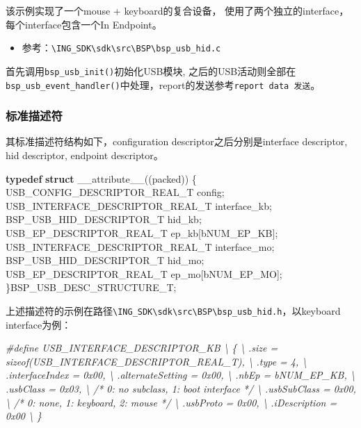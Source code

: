 \documentclass[
  12pt,
]{book}
\newenvironment{Shaded}{\begin{snugshade}}{\end{snugshade}}
\newcommand{\KeywordTok}[1]{\textcolor[rgb]{0.13,0.29,0.53}{\textbf{#1}}}
\newcommand{\NormalTok}[1]{#1}
\newcommand{\PreprocessorTok}[1]{\textcolor[rgb]{0.56,0.35,0.01}{\textit{#1}}}
\providecommand{\tightlist}{%
  \setlength{\itemsep}{0pt}\setlength{\parskip}{0pt}}
\begin{document}
该示例实现了一个mouse + keyboard的复合设备， 使用了两个独立的interface，每个interface包含一个In Endpoint。

\begin{itemize}
\tightlist
\item
  参考：\texttt{\textbackslash{}ING\_SDK\textbackslash{}sdk\textbackslash{}src\textbackslash{}BSP\textbackslash{}bsp\_usb\_hid.c}
\end{itemize}

首先调用\texttt{bsp\_usb\_init()}初始化USB模块, 之后的USB活动则全部在\texttt{bsp\_usb\_event\_handler()}中处理，report的发送参考\texttt{report\ data\ 发送}。

\hypertarget{ux6807ux51c6ux63cfux8ff0ux7b26}{%
\subsubsection{标准描述符}\label{ux6807ux51c6ux63cfux8ff0ux7b26}}

其标准描述符结构如下，configuration descriptor之后分别是interface descriptor, hid descriptor, endpoint descriptor。

\begin{Shaded}
\begin{Highlighting}[]
\KeywordTok{typedef} \KeywordTok{struct}\NormalTok{ __attribute__((packed))}
\NormalTok{\{}
\NormalTok{  USB_CONFIG_DESCRIPTOR_REAL_T config;}
\NormalTok{  USB_INTERFACE_DESCRIPTOR_REAL_T interface_kb;}
\NormalTok{  BSP_USB_HID_DESCRIPTOR_T hid_kb;}
\NormalTok{  USB_EP_DESCRIPTOR_REAL_T ep_kb[bNUM_EP_KB];}
\NormalTok{  USB_INTERFACE_DESCRIPTOR_REAL_T interface_mo;}
\NormalTok{  BSP_USB_HID_DESCRIPTOR_T hid_mo;}
\NormalTok{  USB_EP_DESCRIPTOR_REAL_T ep_mo[bNUM_EP_MO];}
\NormalTok{\}BSP_USB_DESC_STRUCTURE_T;}
\end{Highlighting}
\end{Shaded}

上述描述符的示例在路径\texttt{\textbackslash{}ING\_SDK\textbackslash{}sdk\textbackslash{}src\textbackslash{}BSP\textbackslash{}bsp\_usb\_hid.h}，以keyboard interface为例：

\begin{Shaded}
\begin{Highlighting}[]
\PreprocessorTok{#define USB_INTERFACE_DESCRIPTOR_KB \textbackslash{}}
\PreprocessorTok{\{ \textbackslash{}}
\PreprocessorTok{  .size = sizeof(USB_INTERFACE_DESCRIPTOR_REAL_T), \textbackslash{}}
\PreprocessorTok{  .type = 4, \textbackslash{}}
\PreprocessorTok{  .interfaceIndex = 0x00, \textbackslash{}}
\PreprocessorTok{  .alternateSetting = 0x00, \textbackslash{}}
\PreprocessorTok{  .nbEp = bNUM_EP_KB,  \textbackslash{}}
\PreprocessorTok{  .usbClass = 0x03, \textbackslash{}}
\PreprocessorTok{  /* 0: no subclass, 1: boot interface */ \textbackslash{}}
\PreprocessorTok{  .usbSubClass = 0x00, \textbackslash{}}
\PreprocessorTok{  /* 0: none, 1: keyboard, 2: mouse */ \textbackslash{}}
\PreprocessorTok{  .usbProto = 0x00, \textbackslash{}}
\PreprocessorTok{  .iDescription = 0x00 \textbackslash{}}
\PreprocessorTok{\}}
\end{Highlighting}
\end{Shaded}
\end{document}
